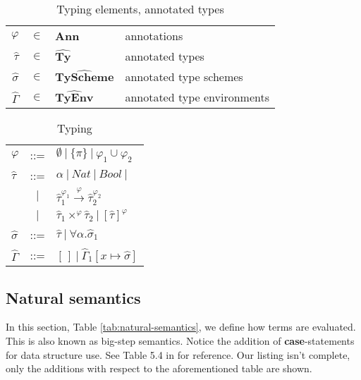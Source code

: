 \documentclass[a4paper]{article}
\begin{document}
\begin{table}
    \centering
    \begin{tabular}{rcll}
        $\varphi$ &               $\in$ & \textbf{Ann}                   & annotations \\ 
        $\widehat{\tau}$&         $\in$ & $\widehat{\textbf{Ty}      } $ & annotated types \\
        $\widehat{\sigma} $&      $\in$ & $\widehat{\textbf{TyScheme}} $ & annotated type schemes\\
        $\widehat{\Gamma}$&       $\in$ & $\widehat{\textbf{TyEnv}   } $ & annotated type environments  \\
    \end{tabular}
    \caption{Typing elements, annotated types}
    \label{tab:typingelems}
\end{table}
\begin{table}
    \centering
    \begin{tabular}{lcl}
        $ \varphi$         & ::= & $ \emptyset \:|\: \{\pi\} \:|\: \varphi_1 \cup \varphi_2 $ \\
        $\widehat{\tau}$   & ::= & $\alpha \:|\: Nat \: | \: Bool \: | \: $ \\
        & $|$ & $\widehat{\tau}_1^{\varphi_1}
                           \stackrel{\varphi}{\rightarrow} 
                           \widehat{\tau}_2^{\varphi_2} $ \\
                           & $|$ & $ \widehat{\tau}_1 \times^\varphi
                           \widehat{\tau}_2 \:|\: [\widehat{\tau}]^\varphi   $ \\ 
        $\widehat{\sigma}$ & ::= & $\widehat{\tau} \:|\: \forall \alpha. \widehat{\sigma}_1 $ \\ 
        $\widehat{\Gamma}$ & ::= & $[\,] \:|\: \widehat{\Gamma}_1[x \mapsto \widehat{\sigma}] $ \\
    \end{tabular}
    \caption{Typing}
    \label{tab:typing}
\end{table}

\subsection{Natural semantics}

In this section, Table \ref{tab:natural-semantics}, we define how terms are
evaluated. This is also known as big-step semantics. Notice the addition of
\textbf{case}-statements for data structure use. See Table 5.4 in \cite{nnh}
for reference. Our listing isn't complete, only the additions with respect to the 
aforementioned table are shown. 
\end{document}
